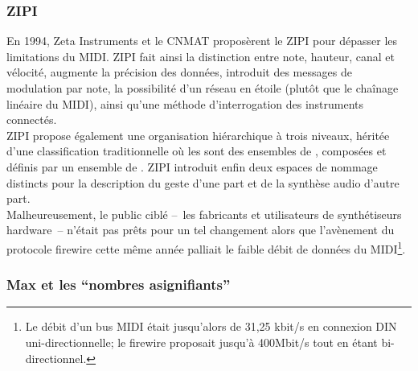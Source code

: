 \subsubsection{ZIPI}

\noindent En 1994, Zeta Instruments et le \gls{CNMAT} proposèrent le \gls{ZIPI}\cite{mcmillen_zipi_1994} pour dépasser les limitations du \gls{MIDI}. \gls{ZIPI} fait ainsi la distinction entre note, hauteur, canal et vélocité, augmente la précision des données, introduit des messages de modulation par note, la possibilité d'un réseau en étoile (plutôt que le chaînage linéaire du \gls{MIDI}), ainsi qu'une méthode d'interrogation des instruments connectés.\\
\indent \gls{ZIPI} propose également une organisation hiérarchique à trois niveaux, héritée d'une classification traditionnelle où les  sont des ensembles de , composées  et définis par un ensemble de . \gls{ZIPI} introduit enfin deux espaces de nommage distincts pour la description du geste d'une part et de la synthèse audio d'autre part.\\
\indent Malheureusement, le public ciblé --~les fabricants et utilisateurs de synthétiseurs hardware~-- n'était pas prêts pour un tel changement alors que l'avènement du protocole \gls{firewire} cette même année palliait le faible débit de données du \gls{MIDI}\footnote{ Le débit d'un bus \gls{MIDI} était jusqu'alors de 31,25 kbit/s en connexion DIN uni-directionnelle; le \gls{firewire} proposait jusqu'à 400Mbit/s tout en étant bi-directionnel.}.

\subsubsection{Max et les ``nombres asignifiants''}

